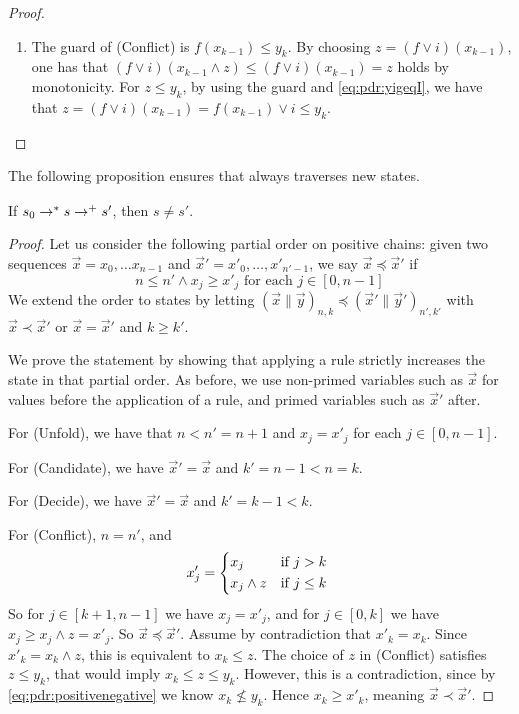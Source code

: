 \begin{proof}
\begin{enumerate}
		\item The guard of (Conflict) is $f(x_{k-1}) \le y_k$. By choosing $z=(f \lor i)(x_{k-1})$, one has that $(f \lor i)(x_{k-1} \land z) \le (f \lor i)(x_{k-1}) =z$ holds by monotonicity.
		      For $z \le y_k$, by using the guard and \eqref{eq:pdr:yigeqI}, we have that $z= (f \lor i)(x_{k-1}) = f(x_{k-1}) \lor i \le y_k$.
	\end{enumerate}
\end{proof}

The following proposition ensures that {\APDR} always traverses new states.
\begin{prop}\label{prop:pdr:progres}
	If $s_0 \stackrel{}{\to^*} s \stackrel{ }{\to^+} s'$, then $s\neq s'$.
\end{prop}
\begin{proof}
	Let us consider the following partial order on positive chains: given two sequences $\vec{x}= x_0, \dots x_{n-1}$ and $\vec{x}' = x'_0, \dots, x'_{n'-1}$, we say $\vec{x} \preceq \vec{x}'$ if
	\begin{equation*}
		n \le n' \land x_j \ge x'_j \text{ for each } j\in[0,n - 1]
	\end{equation*}
	We extend the order to states by letting $(\vec{x} \| \vec{y} )_{n, k} \preceq (\vec{x}' \| \vec{y}' )_{n', k'}$ with $\vec{x} \prec \vec{x}'$ or $\vec{x} = \vec{x}'$ and $k \ge k'$.

	We prove the statement by showing that applying a rule strictly increases the state in that partial order.
	As before, we use non-primed variables such as $\vec{x}$ for values before the application of a rule, and primed variables such as $\vec{x}'$ after.

	For (Unfold), we have that $n < n' = n + 1$ and $x_j = x'_j$ for each $j\in[0,n - 1]$.

	For (Candidate), we have $\vec{x}' = \vec{x}$ and $k' = n - 1 < n = k$.

	For (Decide), we have $\vec{x}' = \vec{x}$ and $k' = k - 1 < k$.

	For (Conflict), $n = n'$, and
	\[
	x'_j = \begin{cases*}
		x_j         & if $j > k$   \\
		x_j \land z & if $j \le k$
	\end{cases*}
	\]
	So for $j\in[k+1,n - 1]$ we have $x_j = x'_j$, and for $j\in[0,k]$ we have $x_j \ge x_j \land z = x'_j$. So $\vec{x} \preceq \vec{x}'$. Assume by contradiction that $x'_k = x_k$. Since $x'_k = x_k \land z$, this is equivalent to $x_k \le z$. The choice of $z$ in (Conflict) satisfies $z \le y_k$, that would imply $x_k \le z \le y_k$. However, this is a contradiction, since by \eqref{eq:pdr:positivenegative} we know $x_k \not \le y_k$. Hence $x_k \ge x'_k$, meaning $\vec{x} \prec \vec{x}'$.
\end{proof}

